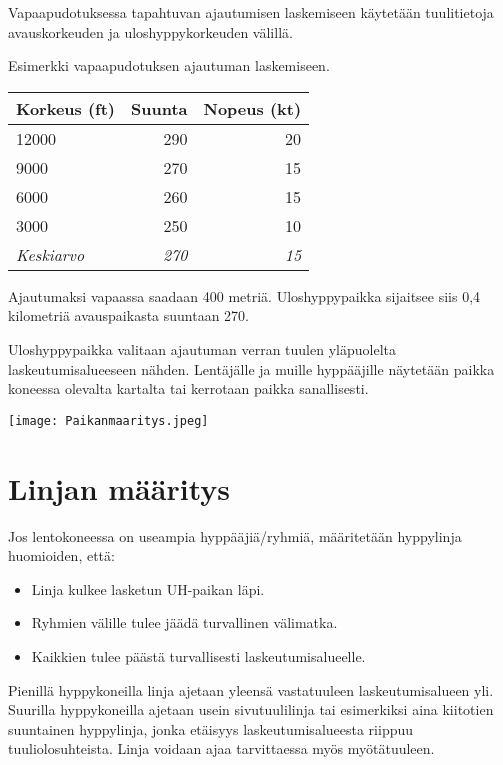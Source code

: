 Vapaapudotuksessa tapahtuvan ajautumisen laskemiseen käytetään tuulitietoja avauskorkeuden ja uloshyppykorkeuden välillä.  


Esimerkki vapaapudotuksen ajautuman laskemiseen. 

\begin{tabular}[]{|l|r|r|}
\hline
 \textbf{Korkeus (ft)} &  \textbf{Suunta} &  \textbf{Nopeus (kt)}
\\ \hline
 12000 &  290 &  20
\\ \hline
 9000 &  270 &  15
\\ \hline
 6000 &  260 &  15
\\ \hline
 3000 &  250  &  10
\\ \hline
 \textit{Keskiarvo} &  \textit{270} &  \textit{15}
\\ \hline
\end{tabular}

Ajautumaksi vapaassa saadaan 400 metriä. Uloshyppypaikka sijaitsee siis 0,4 kilometriä avauspaikasta suuntaan 270. 


Uloshyppypaikka valitaan ajautuman verran tuulen yläpuolelta laskeutumisalueeseen nähden. Lentäjälle ja muille hyppääjille näytetään paikka koneessa olevalta kartalta tai kerrotaan paikka sanallisesti. 


\begin{Figure}\centering\texttt{[image: Paikanmaaritys.jpeg]}\end{Figure} 

\section{ Linjan määritys }
\label{uloshyppypaikan-maaritys-linjan-maaritys}


Jos lentokoneessa on useampia hyppääjiä/ryhmiä, määritetään hyppylinja huomioiden, että: 

\begin{itemize}
\item  Linja kulkee lasketun UH-paikan läpi. 
\item  Ryhmien välille tulee jäädä turvallinen välimatka. 
\item  Kaikkien tulee päästä turvallisesti laskeutumisalueelle. 
\end{itemize}

Pienillä hyppykoneilla linja ajetaan yleensä vastatuuleen laskeutumisalueen yli. Suurilla hyppykoneilla ajetaan usein sivutuulilinja tai esimerkiksi aina kiitotien suuntainen hyppylinja, jonka etäisyys laskeutumisalueesta riippuu tuuliolosuhteista. Linja voidaan ajaa tarvittaessa myös myötätuuleen. 


